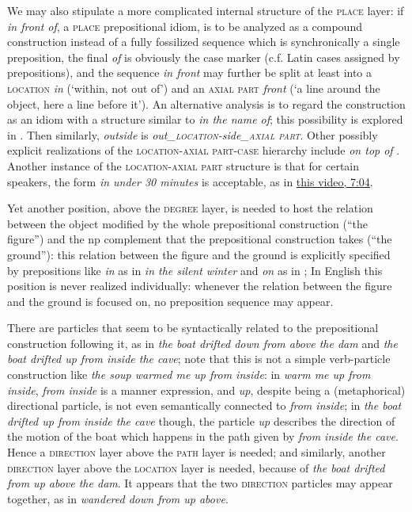 \documentclass[UTF8, a4paper, oneside, scheme=plain, 12pt]{ctexbook}
\newcommand{\form}[1]{\emph{#1}}
\newcommand{\category}[1]{\textsc{#1}}
\newcommand{\translate}[1]{`#1'}
\begin{document}
We may also stipulate a more complicated internal structure of the \category{place} layer:
if \form{in front of}, a \category{place} prepositional idiom, 
is to be analyzed as a compound construction
instead of a fully fossilized sequence which is synchronically a single preposition,
the final \form{of} is obviously the case marker 
(c.f. Latin cases assigned by prepositions),
and the sequence \form{in front} may further be split at least into 
a \category{location} \form{in} (\translate{within, not out of}) 
and an \category{axial part} \form{front} (\translate{a line around the object, here a line before it}).
An alternative analysis is to regard the construction as an idiom 
with a structure similar to \form{in the name of};
this possibility is explored in .
Then similarly, \form{outside} is \form{out_{\category{location}}-side_{\category{axial part}}}.
Other possibly explicit realizations of the 
\category{location}-\category{axial part}-\category{case} hierarchy
include \form{on top of} \citep{spatialpp}.
Another instance of the \category{location}-\category{axial part} structure is 
that for certain speakers, the form \form{in under 30 minutes} is acceptable,
as in \href{https://www.youtube.com/watch?v=ry5Du60WPGU}{this video, 7:04}.

Yet another position, above the \category{degree} layer, is needed 
to host the relation between the object modified by the whole prepositional construction
(``the figure'')
and the \acs{np} complement that the prepositional construction takes (``the ground''):
this relation between the figure and the ground 
is explicitly specified by prepositions like \form{in} as in \form{in the silent winter}
and \form{on} as in \form{};
In English this position is never realized individually:
whenever the relation between the figure and the ground is focused on, 
no preposition sequence may appear. 

There are particles that 
seem to be syntactically related to the prepositional construction following it,
as in \form{the boat drifted down from above the dam}
and \form{the boat drifted up from inside the cave};
note that this is not a simple verb-particle construction 
like \form{the soup warmed me up from inside}:
in \form{warm me up from inside}, \form{from inside} is a manner expression,
and \form{up}, despite being a (metaphorical) directional particle, 
is not even semantically connected to \form{from inside};
in \form{the boat drifted up from inside the cave} though, 
the particle \form{up} describes the direction of the motion of the boat 
which happens in the path given by \form{from inside the cave}.
Hence a \category{direction} layer above the \category{path} layer is needed; 
and similarly, another \category{direction} layer above the \category{location} layer 
is needed, because of \form{the boat drifted from up above the dam}.
It appears that the two \category{direction} particles may appear together,
as in \form{wandered down from up above}.
\end{document}
